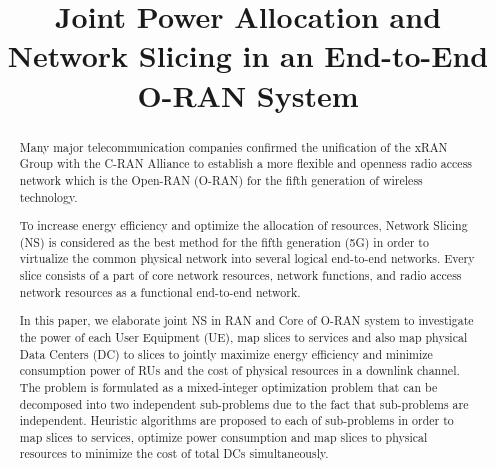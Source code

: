 \documentclass[conference]{IEEEtran}
\begin{document}
\title{Joint Power Allocation and Network Slicing in an End-to-End O-RAN System
}

\author{
\and
{}
\and
{}

}

\maketitle

\begin{abstract}
Many major telecommunication companies confirmed the unification of the xRAN Group with the C-RAN Alliance to establish a more flexible and openness radio access network which is the Open-RAN
(O-RAN) for the fifth generation of wireless technology.


To increase energy efficiency and optimize the allocation of resources, Network Slicing (NS) is considered as the best method for the fifth generation (5G) in order to virtualize the common physical network into several logical end-to-end networks. Every slice consists of a part of core network resources, network functions, and radio access network resources as a functional end-to-end network.


In this paper, we elaborate joint NS in RAN and Core of O-RAN system to investigate the power
of each User Equipment (UE), map slices to services and also map physical Data Centers (DC) to slices to jointly maximize energy efficiency and minimize consumption power of RUs and the cost of  physical resources in a downlink channel. The problem is formulated as a mixed-integer optimization problem that can be decomposed into two independent sub-problems due to the fact that sub-problems are independent.
Heuristic algorithms are proposed to each of sub-problems in order to map slices to services, optimize power consumption and map slices to physical resources to minimize the cost of total DCs simultaneously.
\end{abstract}
\end{document}

